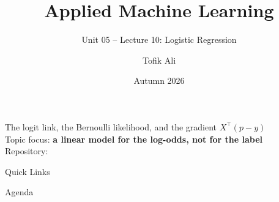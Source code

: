 \documentclass[aspectratio=169]{beamer}
\title[Applied Machine Learning]{Applied Machine Learning}
\subtitle{Unit 05 -- Lecture 10: Logistic Regression}
\author{Tofik Ali}
\institute{School of Computer Science, UPES Dehradun}
\date{Autumn 2026}
\begin{document}
\UPESCoverFrame
\setcounter{framenumber}{0}

\begin{frame}
  \titlepage
  \begin{center}
    \footnotesize The logit link, the Bernoulli likelihood, and the
    gradient $X^{\!\top}(p-y)$\\[0.25em]
    \footnotesize Topic focus: \textbf{a linear model for the log-odds, not
    for the label}\\[0.25em]
    \footnotesize Repository: \texttt{\AMLRepoURL}
  \end{center}
  \slidesources{\AMLUnitVSources}
\end{frame}

\begin{frame}{Quick Links}
  \centering
  \hyperlink{sec:why}{}\hspace{0.4em}
  \hyperlink{sec:logit}{}\hspace{0.4em}
  \hyperlink{sec:mle}{}\hspace{0.4em}
  \hyperlink{sec:odds}{}\hspace{0.4em}
  \hyperlink{sec:thresh}{}\hspace{0.4em}
  \hyperlink{sec:multi}{}\hspace{0.4em}
  \hyperlink{sec:sep}{}\hspace{0.4em}
  \hyperlink{sec:summary}{}
\end{frame}

\begin{frame}{Agenda}
  \tableofcontents
\end{frame}
\end{document}
